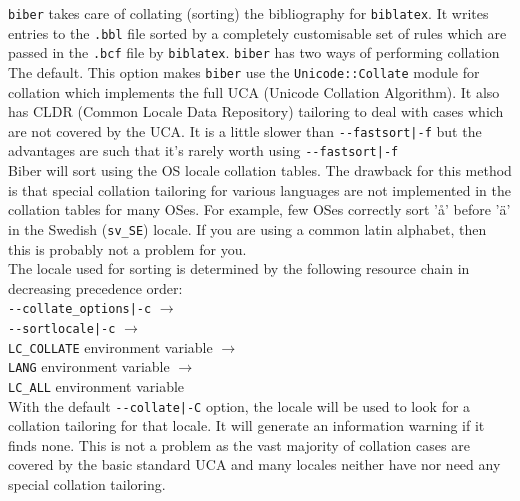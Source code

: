\documentclass{ltxdockit}
\def\biberex#1{\hbox{\hspace{-4em}\texttt{\small \detokenize{#1}}}}
\begin{document}
\verb+biber+ takes care of collating (sorting) the bibliography for
\verb+biblatex+. It writes entries to the \verb+.bbl+ file sorted by a
completely customisable set of rules which are passed in the
\verb+.bcf+ file by \verb+biblatex+. \verb+biber+ has two ways of performing
collation\\[2ex]

\biberex{--collate|-C} The default. This option makes \verb+biber+ use the
  \verb+Unicode::Collate+ module for collation which implements the full UCA (Unicode
  Collation Algorithm). It also has CLDR (Common Locale Data
  Repository) tailoring to deal with cases which are not covered by the
  UCA. It is a little slower than \verb+--fastsort|-f+ but the
  advantages are such that it's rarely worth using \verb+--fastsort|-f+\\[1ex]

\biberex{--fastsort|-f} Biber will sort using
  the OS locale collation tables. The drawback for this method is that special
  collation tailoring for various languages are not implemented in the
  collation tables for many OSes. For example, few OSes correctly sort 'å'
  before 'ä' in the Swedish (\verb+sv_SE+) locale. If you are using a
  common latin alphabet, then this is probably not a problem for you.\\[2ex]

\noindent The locale used for sorting is determined by the following resource
chain in decreasing precedence order:\\[2ex]

\noindent\verb+--collate_options|-c+ $\rightarrow$\\
\hspace*{1em}\verb+--sortlocale|-c+ $\rightarrow$\\
\hspace*{2em}\verb+LC_COLLATE+ environment variable $\rightarrow$\\
\hspace*{3em}\verb+LANG+ environment variable $\rightarrow$\\
\hspace*{4em}\verb+LC_ALL+ environment variable\\[2ex]

\noindent With the default \verb+--collate|-C+ option, the locale will
be used to look for a collation tailoring for that locale. It will generate an
information warning if it finds none. This is not a problem as the vast
majority of collation cases are covered by the basic standard UCA and many
locales neither have nor need any special collation tailoring.
\end{document}

